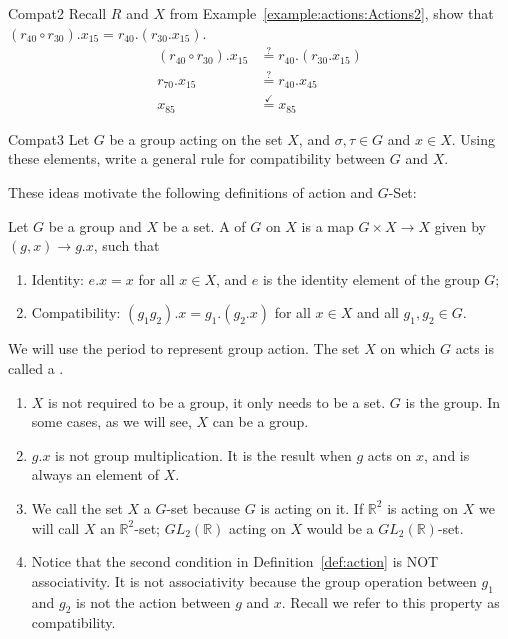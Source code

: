 \begin{example}{Compat2} Recall $R$ and $X$ from Example~\ref{example:actions:Actions2}, show that $(r_{40} \circ r_{30}).x_{15}=r_{40}.(r_{30}.x_{15})$.
\begin{equation*}
\begin{split}
(r_{40} \circ r_{30}).x_{15}&\stackrel{?}{=}r_{40}.(r_{30}.x_{15}) \\
 r_{70}.x_{15}&\stackrel{?}{=}r_{40}.x_{45}\\
x_{85}&\stackrel{\checkmark}{=}x_{85}
\end{split}
\end{equation*}
\end {example}

\begin{exercise}{Compat3} Let $G$ be a group acting on the set $X$, and $\sigma, \tau \in G$ and $x \in X$. Using these elements, write a general rule for compatibility between $G$ and $X$.
\end{exercise}

These ideas motivate the following definitions of action and $G$-Set:

\begin{defn}\label{def:action}
Let $G$ be a group and $X$ be a set. A  of $G$ on $X$ is a map $G\times X\rightarrow X$ given by $(g, x)\rightarrow g.x$, such that
\begin{enumerate}[(1)]
\item Identity: $e.x = x$ for all $x\in X$, and $e$ is the identity element of the group $G$;
\item Compatibility: $(g_1g_2).x = g_1.(g_2.x)$ for all $x\in X$ and all $g_1, g_2 \in G$.
\end{enumerate}
We will use the period to represent group action. The set $X$ on which $G$ acts is called a  .
\end{defn}

\begin{rem}
\begin{enumerate}[(1)]
\item $X$ is not required to be a group, it only needs to be a set. $G$ is the group. In some cases, as we will see, $X$ can be a group.
\item $g.x$ is not group multiplication. It is the result when $g$ acts on $x$, and is always an element of $X$.
\item We call the set $X$ a $G$-set because $G$ is acting on it. If $\mathbb{R}^2$ is acting on $X$ we will call $X$ an $\mathbb{R}^2$-set; $GL_2 (\mathbb{R})$ acting on $X$ would be a $GL_2 (\mathbb{R})$-set.
\item Notice that the second condition in Definition~\ref{def:action} is NOT associativity. It is not associativity because the group operation between $g_1$ and $g_2$ is not the action between $g$ and $x$. Recall we refer to this property as compatibility.
\end{enumerate}
\end{rem}

